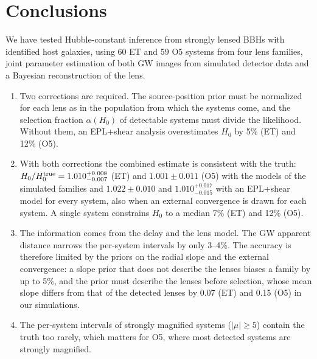 \section{Conclusions}
\label{sec:conclusions}
We have tested Hubble-constant inference from strongly lensed BBHs with identified host galaxies, using 60 ET and 59 O5 systems from four lens families, joint parameter estimation of both GW images from simulated detector data and a Bayesian reconstruction of the lens.
\begin{enumerate}
\item Two corrections are required. The source-position prior must be normalized for each lens as in the population from which the systems come, and the selection fraction $\alpha(H_0)$ of detectable systems must divide the likelihood. Without them, an EPL+shear analysis overestimates $H_0$ by 5\% (ET) and 12\% (O5).
\item With both corrections the combined estimate is consistent with the truth: $H_0/H_0^{\rm true}=1.010^{+0.008}_{-0.007}$ (ET) and $1.001\pm0.011$ (O5) with the models of the simulated families and $1.022\pm0.010$ and $1.010^{+0.017}_{-0.015}$ with an EPL+shear model for every system, also when an external convergence is drawn for each system. A single system constrains $H_0$ to a median 7\% (ET) and 12\% (O5).
\item The information comes from the delay and the lens model. The GW apparent distance narrows the per-system intervals by only 3--4\%. The accuracy is therefore limited by the priors on the radial slope and the external convergence: a slope prior that does not describe the lenses biases a family by up to 5\%, and the prior must describe the lenses before selection, whose mean slope differs from that of the detected lenses by 0.07 (ET) and 0.15 (O5) in our simulations.
\item The per-system intervals of strongly magnified systems ($|\mu|\ge5$) contain the truth too rarely, which matters for O5, where most detected systems are strongly magnified.
\end{enumerate}
